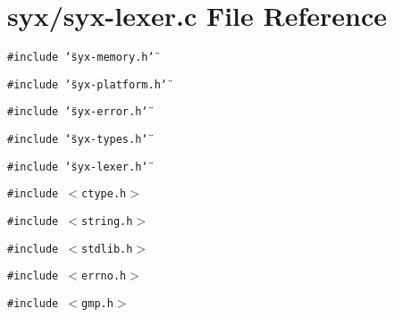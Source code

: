 \hypertarget{syx-lexer_8c}{
\section{syx/syx-lexer.c File Reference}
\label{syx-lexer_8c}
}
{\tt \#include \char`\"{}syx-memory.h\char`\"{}}\par
{\tt \#include \char`\"{}syx-platform.h\char`\"{}}\par
{\tt \#include \char`\"{}syx-error.h\char`\"{}}\par
{\tt \#include \char`\"{}syx-types.h\char`\"{}}\par
{\tt \#include \char`\"{}syx-lexer.h\char`\"{}}\par
{\tt \#include $<$ctype.h$>$}\par
{\tt \#include $<$string.h$>$}\par
{\tt \#include $<$stdlib.h$>$}\par
{\tt \#include $<$errno.h$>$}\par
{\tt \#include $<$gmp.h$>$}\par
